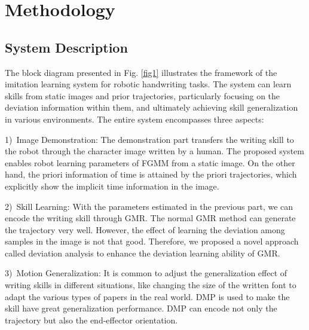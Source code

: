 \documentclass[conference]{IEEEtran}
\begin{document}
\section{Methodology}
\subsection{System Description}
The block diagram presented in Fig. \ref{fig1} illustrates the framework of the imitation learning system for robotic handwriting tasks. The system can learn skills from static images and prior trajectories, particularly focusing on the deviation information within them, and ultimately achieving skill generalization in various environments. The entire system encompasses three aspects:

1)~Image Demonstration: The demonstration part transfers the writing skill to the robot through the character image written by a human. The proposed system enables robot learning parameters of FGMM from a static image. On the other hand, the priori information of time is attained by the priori trajectories, which explicitly show the implicit time information in the image.

2)~Skill Learning: With the parameters estimated in the previous part, we can encode the writing skill through GMR. The normal GMR method can generate the trajectory very well. However, the effect of learning the deviation among samples in the image is not that good. Therefore, we proposed a novel approach called deviation analysis to enhance the deviation learning ability of GMR.

3)~Motion Generalization: It is common to adjust the generalization effect of writing skills in different situations, like changing the size of the written font to adapt the various types of papers in the real world. DMP is used to make the skill have great generalization performance. DMP can encode not only the trajectory but also the end-effector orientation.
\end{document}
